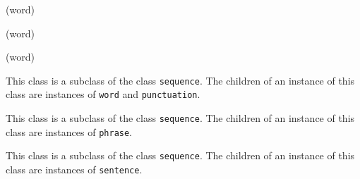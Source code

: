  {(word)}

 {(word)}

 {(word)}
















This class is a subclass of the class \texttt{sequence}.  The children
of an instance of this class are instances of \texttt{word} and
\texttt{punctuation}.


This class is a subclass of the class \texttt{sequence}.  The children
of an instance of this class are instances of \texttt{phrase}.


This class is a subclass of the class \texttt{sequence}.  The children
of an instance of this class are instances of \texttt{sentence}.

